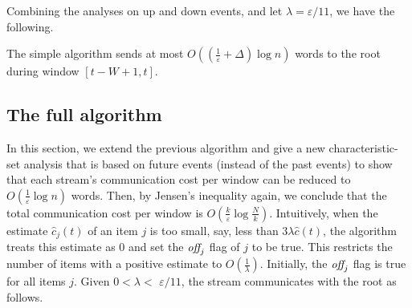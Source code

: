 \documentclass[proceedings]{stacs}
\theoremstyle{definition}\newtheorem{fact}{Fact}
\newcommand{\hns}{\hat c}
\newcommand{\hcjs}{\hat c_{j}}
\newcommand{\off}{\mbox{\it off}_{j}}
\begin{document}
\vspace{.5ex}
Combining the analyses on up and down events,
and let $\lambda = \varepsilon / 11$,  we have the following.
\begin{theorem}\label{thm:simple}
  {
The simple algorithm
sends at most $O( (\frac{1}{\varepsilon} + \Delta) \log n)$ words
to the root during window $[t-W+1, t]$.}
\end{theorem}

\vspace*{-1ex}
\subsection{The full algorithm}
\label{sect:fullAlg}
\vspace*{-1ex}
In this section, we extend the previous algorithm and
give a new characteristic-set analysis that is based on
future events (instead of the past events) to show that
  {each stream's communication cost per window can be
  reduced to
$O(\frac{1}{\varepsilon} \log n)$ words.  Then,
by Jensen's inequality again, we conclude that the total
communication cost
per window is $O(\frac{k}{\varepsilon} \log \frac{N}{k})$.}
Intuitively, when the estimate $\hcjs(t)$ of an item $j$ is too small,
say, less than $3 \lambda \hns(t)$,
the algorithm treats this estimate as 0 and
set the  $\off$ flag of $j$ to be true.
This restricts the number of items with a positive estimate
to $O(\frac{1}{\lambda})$.
Initially, the $\off$ flag is true for all items $j$.
Given $0 < \lambda < $   {$\varepsilon /11$},
 the stream communicates with the root as follows.
\end{document}
